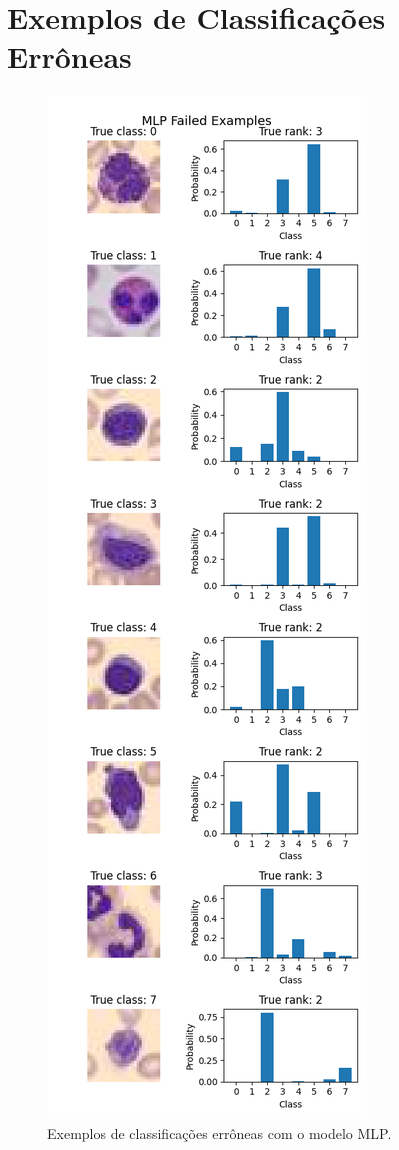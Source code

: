 \documentclass[final,5p]{elsarticle}
\numberwithin{equation}{section}
\begin{document}
\section{Exemplos de Classificações Errôneas}

\begin{figure}[H]
    \includegraphics[width=0.8\columnwidth]{MLP_fails.png}
    \caption{Exemplos de classificações errôneas com o modelo MLP.}\label{fig:ErrosMLP}
\end{figure}
\end{document}
